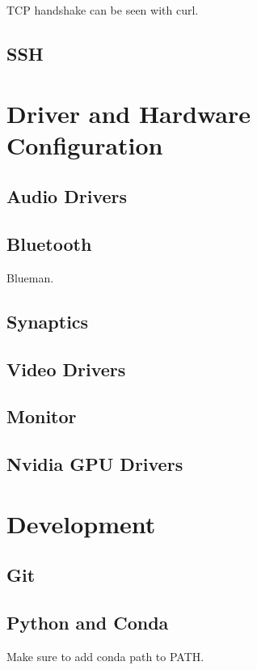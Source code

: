\documentclass{article}
\begin{document}
    TCP handshake can be seen with curl. 

  \subsection{SSH}


\section{Driver and Hardware Configuration}

  \subsection{Audio Drivers} 


  \subsection{Bluetooth}
    Blueman. 

  \subsection{Synaptics}


  \subsection{Video Drivers}


  \subsection{Monitor}


  \subsection{Nvidia GPU Drivers} 


\section{Development}

  \subsection{Git} 
    


  \subsection{Python and Conda}

    Make sure to add conda path to PATH. 
\end{document}
